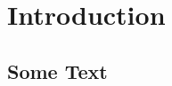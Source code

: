 \chapter{Introduction}
\label{chap:introduction}

\section{Some Text}
\label{sec:introduction}
\lipsum[1-2]
